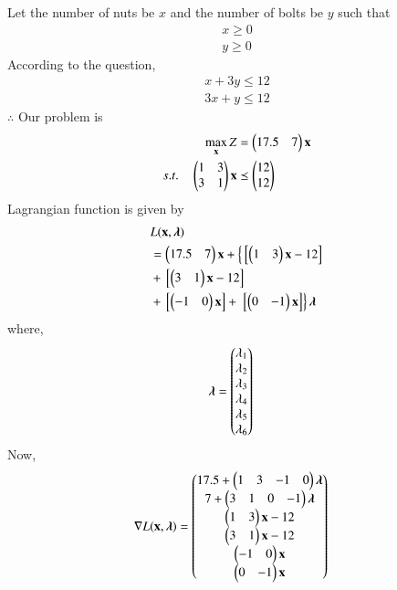 

\begin{table}[!ht]
\centering
{}
\caption{Manufacturer produces nuts and bolts}
\label{opt/15/tab:table1}
\end{table}
Let the number of nuts  be $x$ and the number of bolts be $y$  such that 
\begin{align}
x \geq 0 \\
y \geq 0 
\end{align}
According to the question,
\begin{align}
{x} + 3{y} \leq 12
\\
3{x} + {y} \leq 12
\end{align}
$\therefore$ Our problem is
\begin{align}
\max_{\mathbf{x}} Z &= \begin{pmatrix}17.5 & 7\end{pmatrix}\mathbf{x}\\
s.t. \quad \begin{pmatrix}1 & 3 \\ 3 & 1\end{pmatrix}\mathbf{x} &\preceq \begin{pmatrix}12\\12\end{pmatrix} 
\end{align}
Lagrangian function is given by
\begin{equation}
\begin{aligned}
&L(\mathbf{x},\boldsymbol{\lambda}) \\ &= \begin{pmatrix}17.5 & 7\end{pmatrix}\mathbf{x}+\left\{{}\left[\begin{pmatrix}1 & 3\end{pmatrix}\mathbf{x}-12\right]\right. \\ &+ {}\left[\begin{pmatrix}3 & 1\end{pmatrix}\mathbf{x}-12\right]\\ &+ {}\left[\begin{pmatrix}-1 & 0\end{pmatrix}\mathbf{x}\right] +\left.{}\left[\begin{pmatrix}0 & -1\end{pmatrix}\mathbf{x}\right]\right\}\boldsymbol{\lambda}
\end{aligned}
\end{equation}
where,
\begin{align}
\boldsymbol{\lambda} &= \begin{pmatrix}\lambda_1 \\ \lambda_2 \\ \lambda_3 \\ \lambda_4 \\ \lambda_5 \\ \lambda_6\end{pmatrix}
\end{align}
Now,
\begin{align}
\nabla L(\mathbf{x},\boldsymbol{\lambda}) &= \begin{pmatrix}17.5+ \begin{pmatrix}1 & 3  & -1 & 0 \end{pmatrix}\boldsymbol{\lambda}\\ 7+\begin{pmatrix}3 & 1 & 0 & -1\end{pmatrix}\boldsymbol{\lambda} \\ \begin{pmatrix}1 & 3\end{pmatrix}\mathbf{x}-12 \\ \begin{pmatrix}3 & 1\end{pmatrix}\mathbf{x}-12 \\  \begin{pmatrix}-1 & 0\end{pmatrix}\mathbf{x} \\ \begin{pmatrix}0 & -1\end{pmatrix}\mathbf{x}\end{pmatrix}
\end{align}
